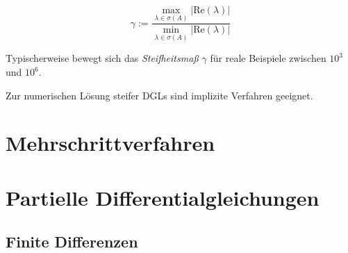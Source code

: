 $$\gamma := \frac{\max_{\lambda \in \sigma(A)}{|\text{Re}(\lambda)|}}{\min_{\lambda \in \sigma(A)}{|\text{Re}(\lambda)|}}$$

Typischerweise bewegt sich das \emph{Steifheitsmaß} $\gamma$ für reale Beispiele zwischen ${10}^3$ und ${10}^6$.

\spacing

Zur numerischen Lösung steifer DGLs sind implizite Verfahren geeignet.

\section*{Mehrschrittverfahren}

\section*{Partielle Differentialgleichungen}

\subsection*{Finite Differenzen}
